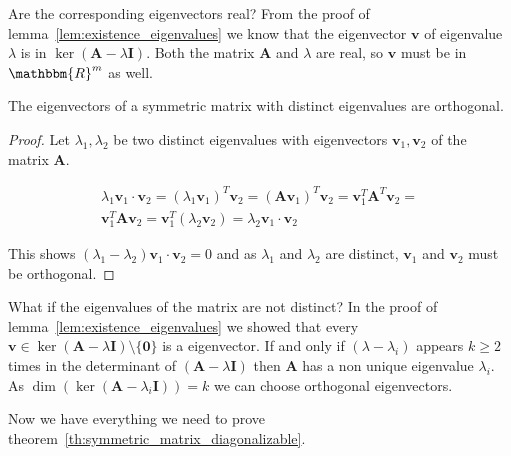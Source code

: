 Are the corresponding eigenvectors real? From the proof of lemma~\ref{lem:existence_eigenvalues} we know that the eigenvector $\mathbf{v}$ of eigenvalue $\lambda$ is in $\ker(\mathbf{A} - \lambda\mathbf{I})$. Both the matrix $\mathbf{A}$ and $\lambda$ are real, so $\mathbf{v}$ must be in $\mathbbm{R}^m$ as well.

\begin{lemma}
	\label{lem:symmetric_matrix_eigenvector_orthogonal}
	The eigenvectors of a symmetric matrix with distinct eigenvalues are orthogonal.
\end{lemma}

\begin{proof}
	Let $\lambda_1, \lambda_2$ be two distinct eigenvalues with eigenvectors $\mathbf{v}_1, \mathbf{v}_2$ of the matrix $\mathbf{A}$.
	
	\begin{align*}
		\lambda_1 \mathbf{v}_1 \cdot \mathbf{v}_2 = (\lambda_1\mathbf{v}_1)^T \mathbf{v}_2 = (\mathbf{Av}_1)^T \mathbf{v}_2 = \mathbf{v}_1^T \mathbf{A}^T \mathbf{v}_2 =\\
		\mathbf{v}_1^T \mathbf{A} \mathbf{v}_2 = \mathbf{v}_1^T (\lambda_2 \mathbf{v}_2) = \lambda_2 \mathbf{v}_1 \cdot \mathbf{v}_2
	\end{align*}
	
	This shows $(\lambda_1 - \lambda_2) \mathbf{v}_1 \cdot \mathbf{v}_2 = 0$ and as $\lambda_1$ and $\lambda_2$ are distinct, $\mathbf{v}_1$ and $\mathbf{v}_2$ must be orthogonal.
\end{proof}

What if the eigenvalues of the matrix are not distinct? In the proof of lemma~\ref{lem:existence_eigenvalues} we showed that every $\mathbf{v} \in \ker(\mathbf{A} - \lambda\mathbf{I}) \setminus \{\mathbf{0}\}$ is a eigenvector. If and only if $(\lambda - \lambda_i)$ appears $k \geq 2$ times in the determinant of $(\mathbf{A} - \lambda\mathbf{I})$ then $\mathbf{A}$ has a non unique eigenvalue $\lambda_i$. As $\dim(\ker(\mathbf{A} - \lambda_i\mathbf{I})) = k$ we can choose orthogonal eigenvectors. 


Now we have everything we need to prove theorem~\ref{th:symmetric_matrix_diagonalizable}. 

